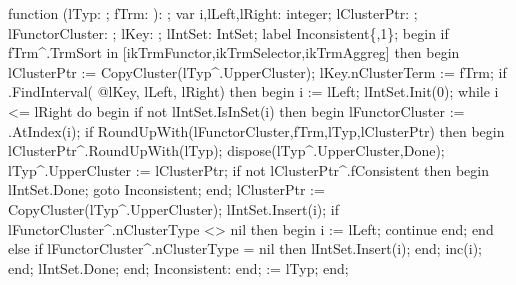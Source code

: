 \nwenddocs{}\endmoddef\nwstartdeflinemarkup{}\nwenddeflinemarkup
function (lTyp: ; fTrm: ): ;
var
   i,lLeft,lRight: integer;
   lClusterPtr: ;
   lFunctorCluster: ;
   lKey: ;
   lIntSet: IntSet;
label Inconsistent\{,1\};
begin
   if fTrm^.TrmSort in [ikTrmFunctor,ikTrmSelector,ikTrmAggreg] then
   begin
      lClusterPtr := CopyCluster(lTyp^.UpperCluster);
      lKey.nClusterTerm := fTrm;
      if .FindInterval( @lKey, lLeft, lRight) then
      begin
         i := lLeft;
         lIntSet.Init(0);
         while i <= lRight do
         begin
            if not lIntSet.IsInSet(i) then
            begin lFunctorCluster := .AtIndex(i);
            if RoundUpWith(lFunctorCluster,fTrm,lTyp,lClusterPtr) then
            begin
               lClusterPtr^.RoundUpWith(lTyp);
               dispose(lTyp^.UpperCluster,Done);
               lTyp^.UpperCluster := lClusterPtr;
               if not lClusterPtr^.fConsistent then
               begin
                  lIntSet.Done;
                  goto Inconsistent;
               end;
               lClusterPtr := CopyCluster(lTyp^.UpperCluster);
               lIntSet.Insert(i);
               if lFunctorCluster^.nClusterType <> nil then
               begin i := lLeft; continue end;
            end
            else if lFunctorCluster^.nClusterType = nil then
               lIntSet.Insert(i);
            end;
            inc(i);
         end;
         lIntSet.Done;
      end;
      Inconsistent:
   end;
    := lTyp;
end;
\eatline
